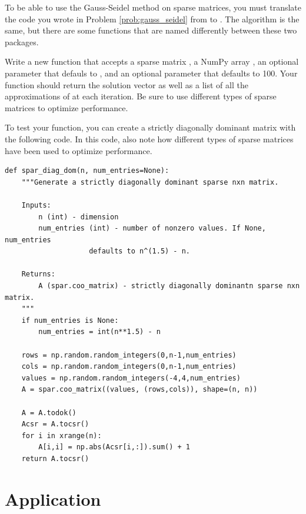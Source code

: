 \begin{problem} %
To be able to use the Gauss-Seidel method on sparse matrices, you must translate
the code you wrote in Problem \ref{prob:gauss_seidel} from  to .
The algorithm is the same, but there are some functions that are named differently
between these two packages.

Write a new function that accepts a sparse matrix , a NumPy array ,
an optional parameter  that defauls to , and an optional parameter
 that defaults to 100. Your function should return the solution
vector  as well as a list of all the approximations of  at each
iteration. Be sure to use different types of sparse matrices to optimize
performance.

To test your function, you can create a strictly diagonally dominant matrix with
the following code. In this code, also note how different types of sparse matrices
have been used to optimize performance.

\begin{lstlisting}
def spar_diag_dom(n, num_entries=None):
    """Generate a strictly diagonally dominant sparse nxn matrix.

    Inputs:
        n (int) - dimension
        num_entries (int) - number of nonzero values. If None, num_entries
                    defaults to n^(1.5) - n.

    Returns:
        A (spar.coo_matrix) - strictly diagonally dominantn sparse nxn matrix.
    """
    if num_entries is None:
        num_entries = int(n**1.5) - n

    rows = np.random.random_integers(0,n-1,num_entries)
    cols = np.random.random_integers(0,n-1,num_entries)
    values = np.random.random_integers(-4,4,num_entries)
    A = spar.coo_matrix((values, (rows,cols)), shape=(n, n))

    A = A.todok()
    Acsr = A.tocsr()
    for i in xrange(n):
        A[i,i] = np.abs(Acsr[i,:]).sum() + 1
    return A.tocsr()
\end{lstlisting}

\end{problem}

\section*{Application} %

